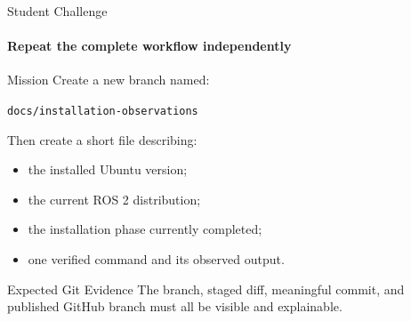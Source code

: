 \begin{frame}{Student Challenge}
\framesubtitle{Repeat the complete workflow independently}

\footnotesize

\begin{block}{Mission}
Create a new branch named:

\begin{center}
\texttt{docs/installation-observations}
\end{center}

Then create a short file describing:

\begin{itemize}
    \setlength{\itemsep}{0.18em}
    \item the installed Ubuntu version;
    \item the current ROS 2 distribution;
    \item the installation phase currently completed;
    \item one verified command and its observed output.
\end{itemize}
\end{block}

\begin{exampleblock}{Expected Git Evidence}
The branch, staged diff, meaningful commit, and published GitHub branch
must all be visible and explainable.
\end{exampleblock}


\end{frame}